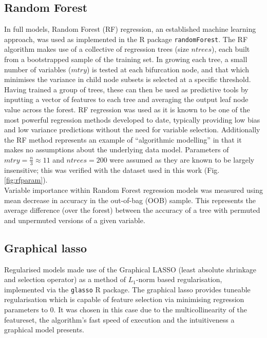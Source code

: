 \documentclass[a4paper]{report}
\begin{document}
\subsection{Random Forest}\label{sec:rf}
In full models, Random Forest (RF) regression,\cite{Breiman2001a} an
established machine learning approach,   was used
as implemented in the R package \texttt{randomForest}.\cite{Liaw2002}
The RF algorithm makes use of a collective of regression trees (size $ntrees$), each built from a
bootstrapped sample of the training set. In growing each tree, a small
number of variables ($mtry$) is tested at each bifurcation node, and that which minimises the
variance in child node subsets is selected at a specific
threshold. Having trained a group of trees, these can then be used as
predictive tools by inputting a vector of features to each tree and
averaging the output leaf node value across the forest. RF regression
was used as it is known to be one of the most powerful regression
methods developed to date,\cite{Svetnik2003, Cutler2007} typically
providing low bias and low variance predictions without the need for
variable selection.\cite{Dasgupta2012}
Additionally the RF method represents an example of ``algorithmic
modelling''\cite{Breiman2001b} in that it makes no assumptions about the
underlying data model.
Parameters of $mtry = \frac{n}{3} \approx 11$ and $ntrees =
200$ were assumed as they are known to be
largely insensitive;\cite{Dasgupta2012, Hastie2001} this was verified
with the dataset used in this work (Fig. \ref{fig:rfparam}). \\

Variable importance within Random Forest regression models was
measured using mean decrease in accuracy in the out-of-bag (OOB) sample. This represents the average
difference (over the forest) between the accuracy of a tree with
permuted and unpermuted versions of a given variable.\cite{Cutler2007,
Dasgupta2012}

\subsection{Graphical lasso}
Regularised models made use of the Graphical LASSO\cite{Friedman2008}
(least absolute shrinkage and selection operator) as a method of
$L_1$-norm based
regularisation, implemented via the \texttt{glasso} R package. The
graphical lasso provides tuneable regularisation which is
capable of feature selection via minimising regression parameters to
0. It was chosen in this case due to the multicollinearity of the
featureset, the algorithm's fast speed of
execution and the intuitiveness a graphical model
presents.\cite{Friedman2008} \\
\end{document}
